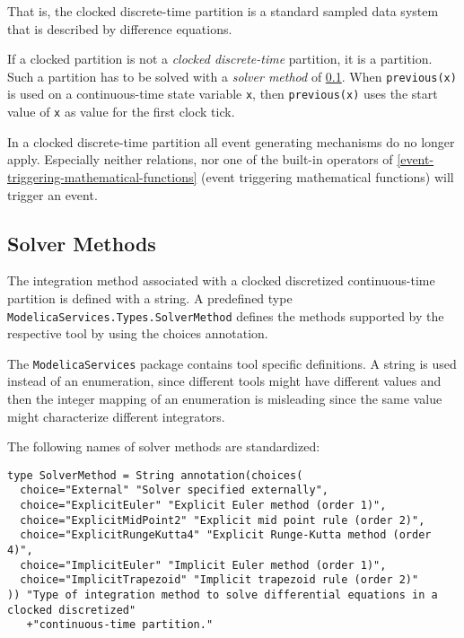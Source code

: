 \begin{nonnormative}
That is, the clocked discrete-time partition is a standard sampled data system that is described by difference equations.
\end{nonnormative}

If a clocked partition is not a \emph{clocked discrete-time} partition, it
is a  partition. Such a
partition has to be solved with a \emph{solver method} of \cref{solver-methods}.
When \lstinline!previous(x)! is used on a continuous-time state variable \lstinline!x!, then
\lstinline!previous(x)! uses the start value of \lstinline!x! as value for the first clock tick.

In a clocked discrete-time partition all event generating mechanisms do
no longer apply. Especially neither relations, nor one of the built-in
operators of \cref{event-triggering-mathematical-functions} (event triggering mathematical functions)
will trigger an event.

\subsection{Solver Methods}\label{solver-methods}

The integration method associated with a clocked discretized
continuous-time partition is defined with a string. A predefined type
\lstinline!ModelicaServices.Types.SolverMethod! defines the methods supported by the
respective tool by using the choices annotation.

\begin{nonnormative}
The \lstinline!ModelicaServices! package contains tool specific definitions.  A string is used instead of an enumeration, since different tools might have different values and then the
integer mapping of an enumeration is misleading since the same value might characterize different integrators.
\end{nonnormative}

The following names of solver methods are standardized:
\begin{lstlisting}[language=modelica]
type SolverMethod = String annotation(choices(
  choice="External" "Solver specified externally",
  choice="ExplicitEuler" "Explicit Euler method (order 1)",
  choice="ExplicitMidPoint2" "Explicit mid point rule (order 2)",
  choice="ExplicitRungeKutta4" "Explicit Runge-Kutta method (order 4)",
  choice="ImplicitEuler" "Implicit Euler method (order 1)",
  choice="ImplicitTrapezoid" "Implicit trapezoid rule (order 2)"
)) "Type of integration method to solve differential equations in a clocked discretized"
   +"continuous-time partition."
\end{lstlisting}

